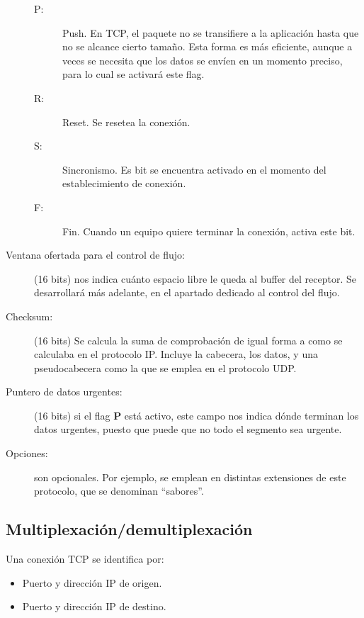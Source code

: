 \begin{description}
\begin{description}
            \item [P:] Push. En \acrshort{TCP}, el paquete no se transifiere a la aplicación hasta que no se alcance cierto tamaño. Esta forma es más eficiente, aunque a veces se necesita que los datos se envíen en un momento preciso, para lo cual se activará este flag.
            \item [R:] Reset. Se resetea la conexión.
            \item [S:] Sincronismo. Es bit se encuentra activado en el momento del establecimiento de conexión.
            \item [F:] Fin. Cuando un equipo quiere terminar la conexión, activa este bit.
        \end{description}
    \item [Ventana ofertada para el control de flujo:] (16 bits) nos indica cuánto espacio libre le queda al buffer del receptor. Se desarrollará más adelante, en el apartado dedicado al control del flujo. 
    \item [Checksum:] (16 bits) Se calcula la suma de comprobación de igual forma a como se calculaba en el protocolo \acrshort{IP}. Incluye la cabecera, los datos, y una pseudocabecera como la que se emplea en el protocolo \acrshort{UDP}.
    \item [Puntero de datos urgentes:] (16 bits) si el flag \textbf{P} está activo, este campo nos indica dónde terminan los datos urgentes, puesto que puede que no todo el segmento sea urgente.
    \item [Opciones:] son opcionales. Por ejemplo, se emplean en distintas extensiones de este protocolo, que se denominan ``sabores''.
\end{description}

\subsection{Multiplexación/demultiplexación}

Una conexión \acrshort{TCP} se identifica por:
\begin{itemize}
    \item Puerto y dirección \acrshort{IP} de origen.
    \item Puerto y dirección \acrshort{IP} de destino.
\end{itemize}

